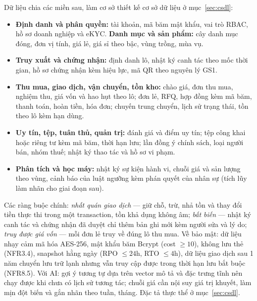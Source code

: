 Dữ liệu chia các miền sau, làm cơ sở thiết kế cơ sở dữ liệu ở mục~\ref{sec:csdl}:
\begin{itemize}
    \item \textbf{Định danh và phân quyền:} tài khoản, mã băm mật khẩu, vai trò RBAC, hồ sơ doanh nghiệp và eKYC. \textbf{Danh mục và sản phẩm:} cây danh mục đóng, đơn vị tính, giá lẻ, giá sỉ theo bậc, vùng trồng, mùa vụ.
    \item \textbf{Truy xuất và chứng nhận:} định danh lô, nhật ký canh tác theo mốc thời gian, hồ sơ chứng nhận kèm hiệu lực, mã QR theo nguyên lý GS1.
    \item \textbf{Thu mua, giao dịch, vận chuyển, tồn kho:} chào giá, đơn thu mua, nghiệm thu, giá vốn và hao hụt theo lô; đơn lẻ, RFQ, hợp đồng kèm mã băm, thanh toán, hoàn tiền, hóa đơn; chuyến trung chuyển, lịch sử trạng thái, tồn theo lô kèm hạn dùng.
    \item \textbf{Uy tín, tệp, tuân thủ, quản trị:} đánh giá và điểm uy tín; tệp công khai hoặc riêng tư kèm mã băm, thời hạn lưu; lần đồng ý chính sách, loại người bán, nhóm thuế; nhật ký thao tác và hồ sơ vi phạm.
    \item \textbf{Phân tích và học máy:} nhật ký sự kiện hành vi, chuỗi giá và sản lượng theo vùng, cảnh báo của luật ngưỡng kèm phán quyết của nhân sự (tích lũy làm nhãn cho giai đoạn sau).
\end{itemize}
Các ràng buộc chính: \emph{nhất quán giao dịch} --- giữ chỗ, trừ, nhả tồn và thay đổi tiền thực thi trong một transaction, tồn khả dụng không âm; \emph{bất biến} --- nhật ký canh tác và chứng nhận đã duyệt chỉ thêm bản ghi mới kèm người sửa và lý do; \emph{truy được giá vốn} --- mỗi đơn lẻ truy về đúng lô thu mua. Về bảo mật: dữ liệu nhạy cảm mã hóa AES-256, mật khẩu băm Bcrypt (cost $\ge 10$), không lưu thẻ (NFR3.4), snapshot hằng ngày (RPO $\le 24$h, RTO $\le 4$h), dữ liệu giao dịch sau 1 năm chuyển lưu trữ lạnh nhưng vẫn truy cập được trong thời hạn lưu bắt buộc (NFR8.5). Với AI: gợi ý tương tự dựa trên vector mô tả và đặc trưng tĩnh nên chạy được khi chưa có lịch sử tương tác; chuỗi giá cần nội suy giá trị khuyết, làm mịn đột biến và gắn nhãn theo tuần, tháng. Đặc tả thực thể ở mục~\ref{sec:csdl}.
